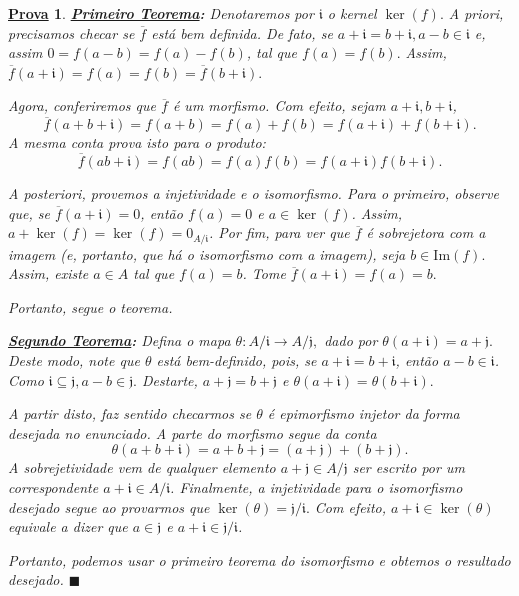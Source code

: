 \documentclass{article}
\newtheorem*{proof*}{\underline{Prova}}
\renewcommand\qedsymbol{$\blacksquare$}
\begin{document}
\begin{proof*}
  \textbf{\underline{Primeiro Teorema}:} Denotaremos por \(\mathfrak{i}\) o kernel \(\ker{(f)}.\)
  A priori, precisamos checar se \(\overline{f}\) está bem definida. De fato, se \(a+\mathfrak{i}=b+\mathfrak{i}, a-b\in \mathfrak{i}\) e, assim
  \(0 = f(a-b) = f(a)-f(b)\), tal que \(f(a) = f(b).\) Assim, \(\overline{f}(a+\mathfrak{i}) = f(a) = f(b) = \overline{f}(b+\mathfrak{i}).\)

  Agora, conferiremos que \(\overline{f}\) é um morfismo. Com efeito, sejam \(a+\mathfrak{i}, b+\mathfrak{i}\),
  \[
    \overline{f}(a+b+\mathfrak{i}) = f(a+b) = f(a)+f(b) = f(a+\mathfrak{i})+f(b+\mathfrak{i}).
  \]
  A mesma conta prova isto para o produto:
  \[
    \overline{f}(ab+\mathfrak{i}) = f(ab) = f(a)f(b) = f(a+\mathfrak{i})f(b+\mathfrak{i}).
  \]

  A posteriori, provemos a injetividade e o isomorfismo. Para o primeiro, observe que, se \(\overline{f}(a+\mathfrak{i}) = 0\), então
  \(f(a) = 0\) e \(a\in\ker{(f)}\). Assim, \(a+\ker{(f)} = \ker{(f)} = 0_{A/\mathfrak{i}}\). Por fim,
  para ver que \(\overline{f}\) é sobrejetora com a imagem (e, portanto, que há o isomorfismo com a imagem),
  seja \(b\in \mathrm{Im}(f).\) Assim, existe \(a\in A\) tal que \(f(a) = b\). Tome \(\overline{f}(a+\mathfrak{i}) = f(a)=b.\)

  Portanto, segue o teorema.

  \textbf{\underline{Segundo Teorema}:} Defina o mapa \(\theta :A/\mathfrak{i}\rightarrow A/\mathfrak{j},\) dado por \(\theta(a+\mathfrak{i}) = a + \mathfrak{j}.\)
  Deste modo, note que \(\theta \) está bem-definido, pois, se \(a+\mathfrak{i} = b+\mathfrak{i}\), então \(a-b\in \mathfrak{i}\). Como
  \(\mathfrak{i}\subseteq \mathfrak{j}, a-b\in \mathfrak{j}.\) Destarte, \(a+\mathfrak{j} = b+\mathfrak{j}\) e \(\theta(a+\mathfrak{i}) = \theta (b+\mathfrak{i}).\)

  A partir disto, faz sentido checarmos se \(\theta \) é epimorfismo injetor da forma desejada no enunciado. A parte do morfismo segue da conta 
  \[
    \theta (a+b+\mathfrak{i}) = a + b + \mathfrak{j} = (a+\mathfrak{j}) + (b+\mathfrak{j}).
  \]
  A sobrejetividade vem de qualquer elemento \(a+\mathfrak{j}\in A/\mathfrak{j}\) ser escrito por um correspondente \(a+\mathfrak{i}\in A/\mathfrak{i}\).
  Finalmente, a injetividade para o isomorfismo desejado segue ao provarmos que \(\ker{(\theta )}=\mathfrak{j}/\mathfrak{i}.\) Com efeito,
  \(a+\mathfrak{i}\in\ker{(\theta )}\) equivale a dizer que \(a\in \mathfrak{j}\) e \(a+\mathfrak{i}\in \mathfrak{j}/\mathfrak{i}\).

  Portanto, podemos usar o primeiro teorema do isomorfismo e obtemos o resultado desejado. \qedsymbol
\end{proof*}
\end{document}

